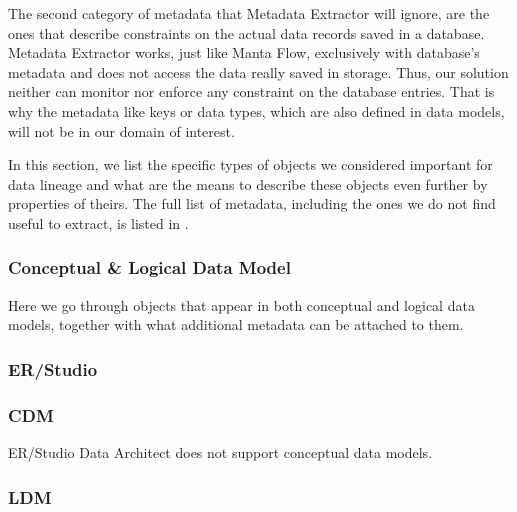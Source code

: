 The second category of metadata that Metadata Extractor will ignore, are the ones that describe constraints on the actual data records saved in a database. 
Metadata Extractor works, just like Manta Flow, exclusively with database's metadata and does not access the data really saved in storage. 
Thus, our solution neither can monitor nor enforce any constraint on the database entries. 
That is why the metadata like keys or data types, which are also defined in data models, will not be in our domain of interest.

In this section, we list the specific types of objects we considered important for data lineage and what are the means to describe these objects even further by properties of theirs. 
The full list of metadata, including the ones we do not find useful to extract, is listed in .

\subsubsection{Conceptual \& Logical Data Model}

Here we go through objects that appear in both conceptual and logical data models, together with what additional metadata can be attached to them.

\subsubsection{ER/Studio}

\subsubsection{CDM}

ER/Studio Data Architect does not support conceptual data models.

\subsubsection{LDM}

